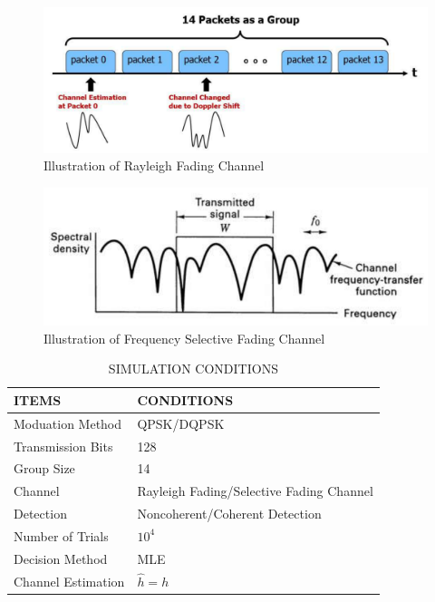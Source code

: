 \documentclass[technicalreport]{ieicej}
\begin{document}
\begin{figure}[tbp]
	\begin{center}
		\vspace{0cm}
		\includegraphics[width=\linewidth,clip]{fig/rayleigh_group.pdf}
		\caption{Illustration of Rayleigh Fading Channel}
		\label{fig:sample}
	\end{center}
\end{figure}

\begin{figure}[tbp]
	\begin{center}
		\vspace{0cm}
		\includegraphics[width=\linewidth,clip]{fig/select_fading_illustrate.pdf}
		\caption{Illustration of Frequency Selective Fading Channel}
		\label{fig:sample}
	\end{center}
\end{figure}

\begin{table}[hb]
	\begin{center}
	\caption{SIMULATION CONDITIONS}
	\label{tbl:simu}
	\small
	\begin{tabular}{ll}
	\hline
	ITEMS & CONDITIONS\\
	\hline
	Moduation Method & QPSK/DQPSK \\
	Transmission Bits & 128 \\
	Group Size & 14 \\
	Channel & Rayleigh Fading/Selective Fading Channel \\
	Detection & Noncoherent/Coherent Detection \\
	Number of Trials & $10^{4}$ \\
	Decision Method & MLE \\
	Channel Estimation & $\hat{h}=h$ \\
	\hline
	\end{tabular}
	\end{center}
\end{table}
\end{document}
